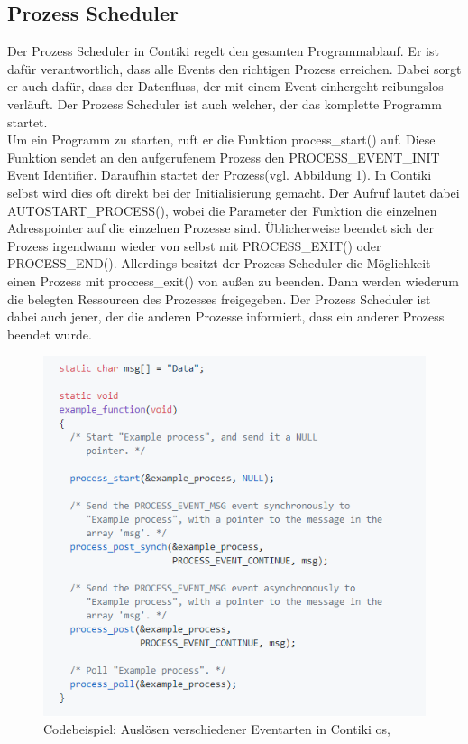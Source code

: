 	\subsection{Prozess Scheduler}
	Der Prozess Scheduler in Contiki regelt den gesamten Programmablauf. Er ist dafür verantwortlich, dass alle Events den richtigen Prozess erreichen. Dabei sorgt er auch dafür, dass der Datenfluss, der mit einem Event einhergeht reibungslos verläuft. Der Prozess Scheduler ist auch welcher, der das komplette Programm startet.\\ 
	Um ein Programm zu starten, ruft er die Funktion process\_start() auf. Diese Funktion sendet an den aufgerufenem Prozess den PROCESS\_EVENT\_INIT Event Identifier. Daraufhin startet der Prozess(vgl. Abbildung \ref{EventsContiki}). In Contiki selbst wird dies oft direkt bei der Initialisierung gemacht. Der Aufruf lautet dabei AUTOSTART\_PROCESS(), wobei die Parameter der Funktion die einzelnen Adresspointer auf die einzelnen Prozesse sind. Üblicherweise beendet sich der Prozess irgendwann wieder von selbst mit PROCESS\_EXIT() oder PROCESS\_END(). Allerdings besitzt der Prozess Scheduler die Möglichkeit einen Prozess mit proccess\_exit() von außen zu beenden. Dann werden wiederum die belegten Ressourcen des Prozesses freigegeben. Der Prozess Scheduler ist dabei auch jener, der die anderen Prozesse informiert, dass ein anderer Prozess beendet wurde.
	\begin{figure}
		\centering
		\includegraphics[scale=0.5]{Grafiken-Julian/ContikiEvents.png}
		\caption{Codebeispiel: Auslösen verschiedener Eventarten in Contiki \ac{os}, \cite{codebesipiel}}
		\label{EventsContiki}
	\end{figure}
